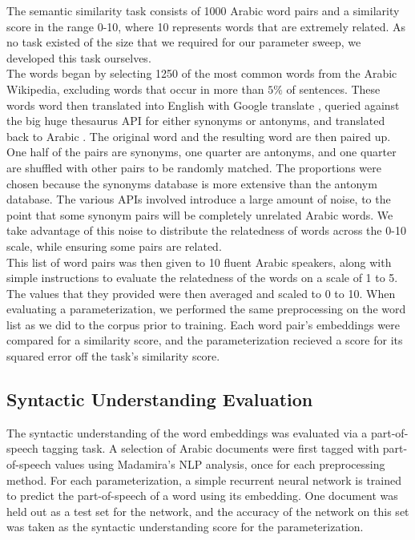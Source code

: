 The semantic similarity task consists of 1000 Arabic word pairs and a similarity score in the range 0-10, where 10 represents words that are extremely related. As no task existed of the size that we required for our parameter sweep, we developed this task ourselves. 
\\
The words began by selecting 1250 of the most common words from the Arabic Wikipedia, excluding words that occur in more than $5\%$ of sentences. These words word then translated into English with Google translate \cite{google:online}, queried against the big huge thesaurus API for either synonyms or antonyms, and translated back to Arabic \cite{bhl:online}. The original word and the resulting word are then paired up. One half of the pairs are synonyms, one quarter are antonyms, and one quarter are shuffled with other pairs to be randomly matched. The proportions were chosen because the synonyms database is more extensive than the antonym database. The various APIs involved introduce a large amount of noise, to the point that some synonym pairs will be completely unrelated Arabic words. We take advantage of this noise to distribute the relatedness of words across the 0-10 scale, while ensuring some pairs are related.
\\
This list of word pairs was then given to 10 fluent Arabic speakers, along with simple instructions to evaluate the relatedness of the words on a scale of 1 to 5. The values that they provided were then averaged and scaled to 0 to 10. When evaluating a parameterization, we performed the same preprocessing on the word list as we did to the corpus prior to training. Each word pair's embeddings were compared for a similarity score, and the parameterization recieved a score for its squared error off the task's similarity score.

\subsection{Syntactic Understanding Evaluation}

The syntactic understanding of the word embeddings was evaluated via a part-of-speech tagging task. A selection of Arabic documents were first tagged with part-of-speech values using Madamira's NLP analysis, once for each preprocessing method. For each parameterization, a simple recurrent neural network is trained to predict the part-of-speech of a word using its embedding. One document was held out as a test set for the network, and the accuracy of the network on this set was taken as the syntactic understanding score for the parameterization.

